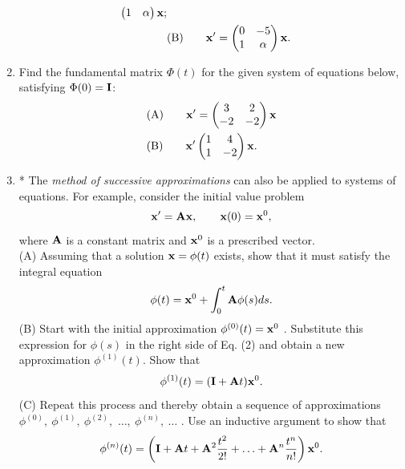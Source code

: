 \documentclass[11pt,a4paper]{article}
\begin{document}
\begin{enumerate}
\begin{align*}
\begin{pmatrix}
				1 & \alpha
			\end{pmatrix}\vb{x};\\
			&\text{(B)}\qquad \vb{x}^\prime =
			\begin{pmatrix}
				0 & -5\\
				1 & \alpha
			\end{pmatrix}\vb{x}.
		\end{align*}
		\item Find the fundamental matrix $\Phi(t)$ for the given system of equations below, satisfying $\Phi(0) = \vb{I}$:
		\begin{align*}
			&\text{(A)}\qquad \vb{x}^\prime = 
			\begin{pmatrix}
				3 & 2\\
				-2 & -2
			\end{pmatrix}\vb{x}\\
			&\text{(B)}\qquad \vb{x}^\prime
			\begin{pmatrix}
				1 & 4\\
				1 & -2
			\end{pmatrix}\vb{x}.
		\end{align*}
		\item * The \textit{method of successive approximations} can also be applied to systems of equations. For example, consider the initial value problem
		\begin{equation}
			\vb{x}^\prime = \vb{Ax},\qquad \vb{x}(0) = \vb{x}^0,
		\end{equation}
		where $\vb{A}$ is a constant matrix and $\vb{x}^0$ is a prescribed vector.\\
		(A) Assuming that a solution $\vb{x} = \phi(t)$ exists, show that it must satisfy the integral equation
		\begin{equation}
			\phi(t) = \vb{x}^0 + \int^t_0 \vb{A}\phi(s)ds.
		\end{equation}
		(B) Start with the initial approximation $\phi^{(0)}(t) = \vb{x}^0$ . Substitute this expression for $\phi(s)$ in the right side of Eq. (2) and obtain a new approximation $\phi^{(1)}(t)$. Show that
		\begin{equation}
			\phi^{(1)}(t) = (\vb{I} + \vb{A}t)\vb{x}^0.
		\end{equation}
		(C) Repeat this process and thereby obtain a sequence of approximations $\phi^{(0)},\ \phi^{(1)},\ \phi^{(2)},$ $\ldots,\ \phi^{(n)},\ \ldots$ . Use an inductive argument to show that
		\begin{equation}
			\phi^{(n)}(t) = \left(\vb{I} + \vb{A}t + \vb{A}^2\frac{t^2}{2!} + \ldots + \vb{A}^n\frac{t^n}{n!}\right)\vb{x}^0.

\end{equation}
\end{enumerate}
\end{document}
